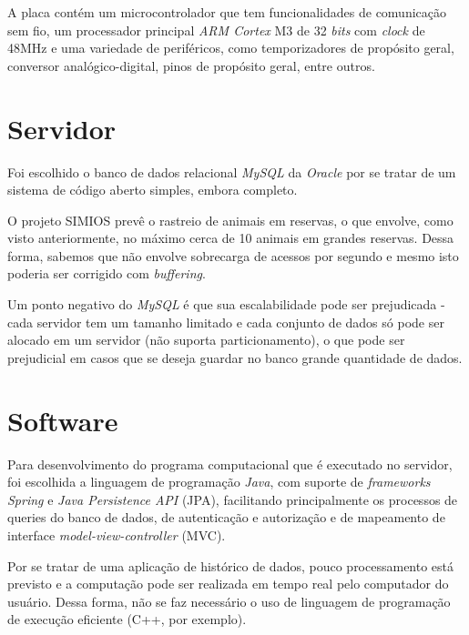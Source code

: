 A placa contém um microcontrolador que tem funcionalidades de comunicação sem fio, um processador principal \emph{ARM Cortex} M3 de 32 \emph{bits} com \emph{clock} de 48MHz e uma variedade de periféricos, como temporizadores de propósito geral, conversor analógico-digital, pinos de propósito geral, entre outros.

\section{Servidor}
Foi escolhido o banco de dados relacional \emph{MySQL} da \emph{Oracle} por se tratar de um sistema de código aberto simples, embora completo.

O projeto SIMIOS prevê o rastreio de animais em reservas, o que envolve, como visto anteriormente, no máximo cerca de 10 animais em grandes reservas. Dessa forma, sabemos que não envolve sobrecarga de acessos por segundo e mesmo isto poderia ser corrigido com \emph{buffering}.

Um ponto negativo do \emph{MySQL} é que sua escalabilidade pode ser prejudicada - cada servidor tem um tamanho limitado e cada conjunto de dados só pode ser alocado em um servidor (não suporta particionamento), o que pode ser prejudicial em casos que se deseja guardar no banco grande quantidade de dados.

\section{Software}
Para desenvolvimento do programa computacional que é executado no servidor, foi escolhida a linguagem de programação \emph{Java}, com suporte de \emph{frameworks} \emph{Spring} e \emph{Java Persistence API} (JPA), facilitando principalmente os processos de queries do banco de dados, de autenticação e autorização e de mapeamento de interface \emph{model-view-controller} (MVC).

Por se tratar de uma aplicação de histórico de dados, pouco processamento está previsto e a computação pode ser realizada em tempo real pelo computador do usuário. Dessa forma, não se faz necessário o uso de linguagem de programação de execução eficiente (C++, por exemplo).
